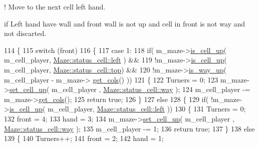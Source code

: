 ! Move to the next cell left hand. 

if Left hand have wall and front wall is not up and cell in front is not way and not discarted. 
\begin{DoxyCode}
114 \{
115     \textcolor{keywordflow}{switch} (front)
116     \{
117         \textcolor{keywordflow}{case} 1:
118             \textcolor{keywordflow}{if}( m\_maze->\hyperlink{classMaze_a2b0e69e72d6c3e1037578f057946a21e}{is\_cell\_up}( m\_cell\_player, 
      \hyperlink{classMaze_a07167e321eac2b67100fb82ecb98f1d1a811882fecd5c7618d7099ebbd39ea254}{Maze::status\_cell::left} ) &&
119                     !m\_maze->\hyperlink{classMaze_a2b0e69e72d6c3e1037578f057946a21e}{is\_cell\_up}( m\_cell\_player, 
      \hyperlink{classMaze_a07167e321eac2b67100fb82ecb98f1d1ab28354b543375bfa94dabaeda722927f}{Maze::status\_cell::top}) &&
120                     !m\_maze->\hyperlink{classMaze_a308fa695665de6217c0e7f28aab5adda}{is\_way\_up}( m\_cell\_player - m\_maze->
      \hyperlink{classMaze_a8a04cd1335e96a80358181afa164d4c9}{get\_cols}() ))
121             \{
122                 Turners = 0;
123                 m\_maze->\hyperlink{classMaze_aa7c832a91a3db8f48b31f688332f8986}{set\_cell\_up}( m\_cell\_player , 
      \hyperlink{classMaze_a07167e321eac2b67100fb82ecb98f1d1ac83b72dd001482ce10f0b106c7a0ed0e}{Maze::status\_cell::way} );
124                 m\_cell\_player -= m\_maze->\hyperlink{classMaze_a8a04cd1335e96a80358181afa164d4c9}{get\_cols}();
125                 \textcolor{keywordflow}{return} \textcolor{keyword}{true};
126             \}
127             \textcolor{keywordflow}{else}
128             \{
129                 \textcolor{keywordflow}{if}( !m\_maze->\hyperlink{classMaze_a2b0e69e72d6c3e1037578f057946a21e}{is\_cell\_up}( m\_cell\_player, 
      \hyperlink{classMaze_a07167e321eac2b67100fb82ecb98f1d1a811882fecd5c7618d7099ebbd39ea254}{Maze::status\_cell::left} )) 
130                 \{
131                     Turners = 0;
132                     front = 4;
133                     hand = 3;
134                     m\_maze->\hyperlink{classMaze_aa7c832a91a3db8f48b31f688332f8986}{set\_cell\_up}( m\_cell\_player , 
      \hyperlink{classMaze_a07167e321eac2b67100fb82ecb98f1d1ac83b72dd001482ce10f0b106c7a0ed0e}{Maze::status\_cell::way} );
135                     m\_cell\_player -= 1;
136                     \textcolor{keywordflow}{return} \textcolor{keyword}{true};
137                 \}
138                 \textcolor{keywordflow}{else}
139                 \{
140                     Turners++;
141                     front = 2;
142                     hand = 1;

\end{DoxyCode}
